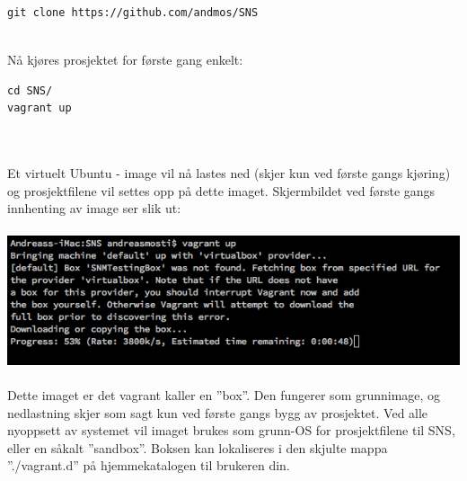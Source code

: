 \documentclass{article}
\begin{document}
\begin{lstlisting}
git clone https://github.com/andmos/SNS
\end{lstlisting}
\\
Nå kjøres prosjektet for første gang enkelt: 
\begin{lstlisting}
cd SNS/
vagrant up
\end{lstlisting}
\\ \\
Et virtuelt Ubuntu - image vil nå lastes ned (skjer kun ved første gangs kjøring) og prosjektfilene vil settes opp på dette imaget. 
Skjermbildet ved første gangs innhenting av image ser slik ut: \\ \\
\includegraphics[scale = 0.7]{vagrantFirstTime.png}
\\ \\
Dette imaget er det vagrant kaller en ''box''. Den fungerer som grunnimage, og nedlastning skjer som sagt kun ved første gangs bygg av prosjektet. Ved alle nyoppsett av systemet vil imaget brukes som grunn-OS for prosjektfilene til SNS, eller en såkalt ''sandbox''. Boksen kan lokaliseres i den skjulte mappa ''./vagrant.d'' på hjemmekatalogen til brukeren din.
\end{document}

